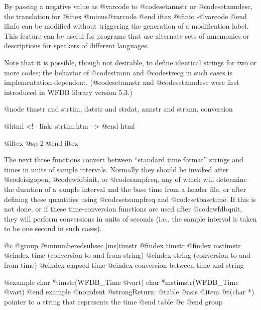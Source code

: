 {{{{{{{{{By passing a negative value as @var{code} to @code{setannstr} or
@code{setanndesc}, the translation for
@iftex
@minus{}@var{code}
@end iftex
@ifinfo
-@var{code}
@end ifinfo
can be modified without triggering the generation of a modification label.
This feature can be useful for programs that use alternate sets of
mnemonics or descriptions for speakers of different languages.

Note that it is possible, though not desirable, to define identical
strings for two or more codes; the behavior of @code{strann} and
@code{strecg} in such cases is implementation-dependent.
(@code{setannstr} and @code{setanndesc} were first introduced in WFDB
library version 5.3.)

@node     timstr and strtim, datstr and strdat, annstr and strann, conversion

@html
<!-- link: strtim.htm -->
@end html

@iftex
@sp 2
@end iftex

The next three functions convert between ``standard time format''
strings and times in units of sample intervals.  Normally they should be
invoked after @code{isigopen}, @code{wfdbinit}, or @code{sampfreq}, any of
which will determine the duration of a sample interval and the base time
from a header file, or after defining these quantities using
@code{setsampfreq} and @code{setbasetime}.  If this is not done, or if
these time-conversion functions are used after @code{wfdbquit}, they will
perform conversions in units of seconds (i.e., the sample interval is
taken to be one second in such cases).

@c @group
@unnumberedsubsec [ms]timstr
@findex timstr
@findex mstimstr
@cindex time (conversion to and from string)
@cindex string (conversion to and from time)
@cindex elapsed time
@cindex conversion between time and string

@example
char *timstr(WFDB_Time @var{t})
char *mstimstr(WFDB_Time @var{t})
@end example
@noindent
@strong{Return:}
@table @asis
@item @t{(char *)}
pointer to a string that represents the time
@end table
@c @end group

}}}}}}}}}
